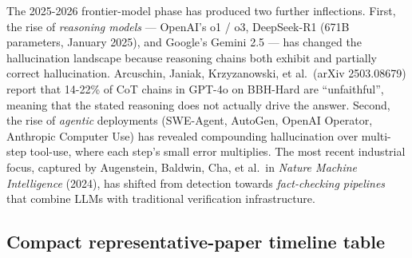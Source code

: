 The 2025-2026 frontier-model phase has produced two further inflections. First, the rise of \emph{reasoning models} --- OpenAI's o1 / o3, DeepSeek-R1 (671B parameters, January 2025), and Google's Gemini 2.5 --- has changed the hallucination landscape because reasoning chains both exhibit and partially correct hallucination. Arcuschin, Janiak, Krzyzanowski, et al.~(arXiv 2503.08679) report that 14-22\% of CoT chains in GPT-4o on BBH-Hard are ``unfaithful'', meaning that the stated reasoning does not actually drive the answer. Second, the rise of \emph{agentic} deployments (SWE-Agent, AutoGen, OpenAI Operator, Anthropic Computer Use) has revealed compounding hallucination over multi-step tool-use, where each step's small error multiplies. The most recent industrial focus, captured by Augenstein, Baldwin, Cha, et al.~in \emph{Nature Machine Intelligence} (2024), has shifted from detection towards \emph{fact-checking pipelines} that combine LLMs with traditional verification infrastructure.

\subsection{Compact representative-paper timeline table}\label{compact-representative-paper-timeline-table}

